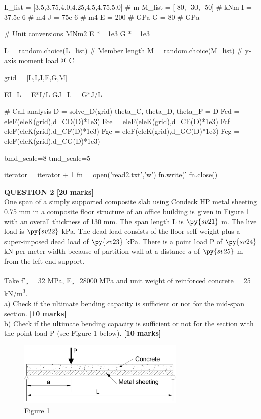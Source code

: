 \documentclass[a4paper,11pt]{article}
\begin{document}
\begin{pycode}
	L_list = [3.5,3.75,4.0,4.25,4.5,4.75,5.0]  # m
	M_list = [-80, -30, -50]	# kNm
	I = 37.5e-6 	# m4
	J = 75e-6   	# m4
	E = 200     	# GPa
	G = 80      	# GPa
	
	# Unit conversions MNm2
	E *= 1e3
	G *= 1e3
	
	L = random.choice(L_list) 		# Member length
	M = random.choice(M_list) 		# y-axis moment load @ C
	
	grid = [L,I,J,E,G,M]
	
	EI_L = E*I/L
	GJ_L = G*J/L
	
	# Call analysis
	D = solve_D(grid)
	theta_C, theta_D, theta_F = D
	Fcd = eleF(eleK(grid),d_CD(D)*1e3)
	Fce = eleF(eleK(grid),d_CE(D)*1e3)
	Fcf = eleF(eleK(grid),d_CF(D)*1e3)
	Fgc = eleF(eleK(grid),d_GC(D)*1e3)
	Fcg = eleF(eleK(grid),d_CG(D)*1e3)
	
	bmd_scale=8
	tmd_scale=5
	
	iterator = iterator + 1
	fn = open('read2.txt','w')
	fn.write('%
	fn.close()
\end{pycode}
\noindent
\textbf{QUESTION 2 [20 marks]}\\
One span of a simply supported composite slab using Condeck HP metal sheeting 0.75 mm in a composite floor structure of an office building is given in Figure 1 with an overall thickness of 130 mm. The span length L is $\py{sv21}$ m. The live load is $\py{sv22}$ kPa. The dead load consists of the floor self-weight plus a super-imposed dead load of $\py{sv23}$ kPa. There is a point load P of $\py{sv24}$ kN per meter width because of partition wall at a distance \emph{a} of $\py{sv25}$ m from the left end support.\\
\\
Take f'\textsubscript{c} = 32 MPa, E\textsubscript{c}=28000 MPa and unit weight of reinforced concrete = 25 kN/m\textsuperscript{3}.
\\
a) Check if the ultimate bending capacity is sufficient or not for the mid-span section. \textbf{[10 marks]}
\\
b) Check if the ultimate bending capacity is sufficient or not for the section with the point load P (see Figure 1 below). \textbf{[10 marks]}
\begin{figure}[ht]
\includegraphics[width=8cm, height=3.05cm]{Figure1.png}\\
\centering
Figure 1\\
\centering
\end{figure}
\end{document}
